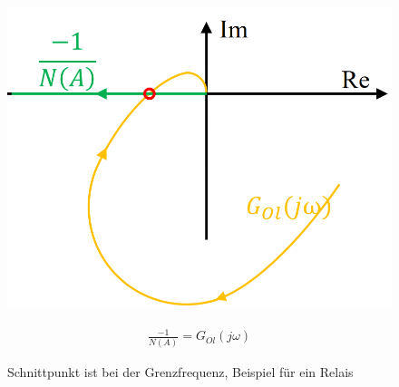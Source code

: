 \begin{figure}[!h]
	\begin{minipage}{0.6\linewidth}
		\centering
		\includegraphics[width=.4\linewidth]{./bilder/Beschreibungsfunk1.png}
		\caption{Schnittpunkt ist bei der Grenzfrequenz, Beispiel für ein Relais}
		\label{fig:Beschreibungsf}
	\end{minipage}
	\begin{minipage}{0.3\linewidth}
		\begin{align}
		\label{eq:Beschreibungsf1}
		\frac{-1}{N(A)} = G_{Ol}(j\omega)
		\end{align}
	\end{minipage}
\end{figure}

\clearpage
\newpage